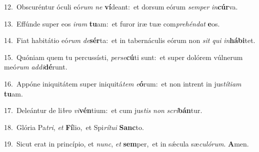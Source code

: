 {\numbfont\textcolor{\numbcolor}{12.}}~Obscuréntur óculi eó\textit{rum} \textit{ne} \textbf{ví}\-deant:~\star et dorsum eórum \textit{sem}\-\textit{per} \textit{in}\-\textbf{cúr}va.\par
{\numbfont\textcolor{\numbcolor}{13.}}~Effúnde super eos \textit{i}\-\textit{ram} \textbf{tu}\-am:~\star et furor iræ tuæ com\-\textit{pre}\-\textit{hén}\textit{dat} \textbf{e}\-os.\par
{\numbfont\textcolor{\numbcolor}{14.}}~Fiat habitátio eó\textit{rum} \textit{de}\-\textbf{sér}ta:~\star et in tabernáculis eórum non \textit{sit} \textit{qui} \textit{in}\-\textbf{há}\textbf{bi}tet.\par
{\numbfont\textcolor{\numbcolor}{15.}}~Quóniam quem tu percussísti, \textit{per}\-\textit{se}\textbf{cú}ti sunt:~\star et super dolórem vúlnerum meó\textit{rum} \textit{ad}\-\textit{di}\textbf{dé}runt.\par
{\numbfont\textcolor{\numbcolor}{16.}}~Appóne iniquitátem super iniquitá\textit{tem} \textit{e}\-\textbf{ó}rum:~\star et non intrent in jus\-\textit{tí}\-\textit{ti}\textit{am} \textbf{tu}\-am.\par
{\numbfont\textcolor{\numbcolor}{17.}}~Deleántur de li\textit{bro} \textit{vi}\-\textbf{vén}tium:~\star et cum jus\textit{tis} \textit{non} \textit{scri}\-\textbf{bán}tur.\par
{\numbfont\textcolor{\numbcolor}{18.}}~Glória Pa\-\textit{tri}\-, \textit{et} \textbf{Fí}\-lio,~\star et Spi\-\textit{rí}\-\textit{tu}\textit{i} \textbf{Sanc}\-to.\par
{\numbfont\textcolor{\numbcolor}{19.}}~Sicut erat in princípio, et \textit{nunc}\-, \textit{et} \textbf{sem}\-per,~\star et in sǽcula sæ\-\textit{cu}\-\textit{ló}\textit{rum}. \textbf{A}\-men.\par

